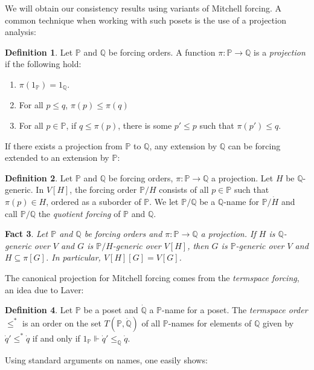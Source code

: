 \documentclass[12pt]{amsart}
\theoremstyle{definition}
\newtheorem{mydef}{Definition}[section]
\theoremstyle{remark}
\theoremstyle{plain}
\newtheorem{myfact}[mydef]{Fact}
\numberwithin{mydef}{section}
\newcommand{\dP}{\mathbb{P}}
\newcommand{\dQ}{\mathbb{Q}}
\begin{document}
	We will obtain our consistency results using variants of Mitchell forcing. A common technique when working with such posets is the use of a projection analysis:
	
	\begin{mydef}
		Let $\dP$ and $\dQ$ be forcing orders. A function $\pi\colon\dP\to\dQ$ is a \emph{projection} if the following hold:
		\begin{enumerate}
			\item $\pi(1_{\dP})=1_{\dQ}$.
			\item For all $p\leq q$, $\pi(p)\leq \pi(q)$
			\item For all $p\in\dP$, if $q\leq \pi(p)$, there is some $p'\leq p$ such that $\pi(p')\leq q$.
		\end{enumerate}
	\end{mydef}
	
	If there exists a projection from $\dP$ to $\dQ$, any extension by $\dQ$ can be forcing extended to an extension by $\dP$:
	
	\begin{mydef}
		Let $\dP$ and $\dQ$ be forcing orders, $\pi\colon\dP\to\dQ$ a projection. Let $H$ be $\dQ$-generic. In $V[H]$, the forcing order $\dP/H$ consists of all $p\in\dP$ such that $\pi(p)\in H$, ordered as a suborder of $\dP$. We let $\dP/\dQ$ be a $\dQ$-name for $\dP/\dot{H}$ and call $\dP/\dQ$ the \emph{quotient forcing} of $\dP$ and $\dQ$.
	\end{mydef}
	
	\begin{myfact}
		Let $\dP$ and $\dQ$ be forcing orders and $\pi\colon\dP\to\dQ$ a projection. If $H$ is $\dQ$-generic over $V$ and $G$ is $\dP/H$-generic over $V[H]$, then $G$ is $\dP$-generic over $V$ and $H\subseteq\pi[G]$. In particular, $V[H][G]=V[G]$.
	\end{myfact}
	
	The canonical projection for Mitchell forcing comes from the \emph{termspace forcing}, an idea due to Laver:
	
	\begin{mydef}
		Let $\dP$ be a poset and $\dot{\dQ}$ a $\dP$-name for a poset. The \emph{termspace order} $\leq^*$ is an order on the set $T(\dP,\dot{\dQ})$ of all $\dP$-names for elements of $\dQ$ given by $\dot{q}'\leq^*\dot{q}$ if and only if $1_{\dP}\Vdash\dot{q}'\leq_{\dQ}\dot{q}$.
	\end{mydef}
	
	Using standard arguments on names, one easily shows:
	
\end{document}
